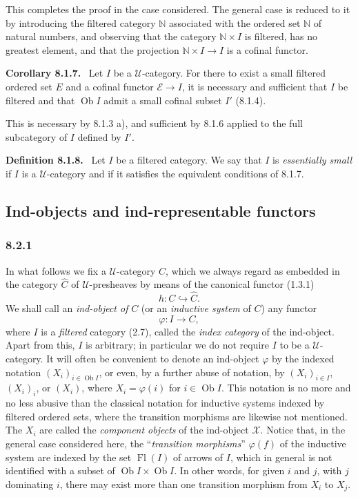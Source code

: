 \documentclass[11pt]{article}
\newcommand{\U}{\mathcal{U}}
\newcommand{\Ob}{\operatorname{Ob}}
\newcommand{\Fl}{\operatorname{Fl}}
\newenvironment{statement}[1]{\par\medskip\noindent\textbf{#1.}\ }{\par\medskip}
\begin{document}
This completes the proof in the case considered. The general case is reduced to it by introducing the filtered category $\mathbb N$ associated with the ordered set $\mathbb N$ of natural numbers, and observing that the category $\mathbb N\times I$ is filtered, has no greatest element, and that the projection $\mathbb N\times I\to I$ is a cofinal functor.

\begin{statement}{Corollary 8.1.7}
Let $I$ be a $\U$-category. For there to exist a small filtered ordered set $E$ and a cofinal functor $\mathcal E\to I$, it is necessary and sufficient that $I$ be filtered and that $\Ob I$ admit a small cofinal subset $I'$ (8.1.4).
\end{statement}

This is necessary by 8.1.3 a), and sufficient by 8.1.6 applied to the full subcategory of $I$ defined by $I'$.

\begin{statement}{Definition 8.1.8}
Let $I$ be a filtered category. We say that $I$ is \emph{essentially small} if $I$ is a $\U$-category and if it satisfies the equivalent conditions of 8.1.7.
\end{statement}

\subsection{Ind-objects and ind-representable functors}

\subsubsection*{8.2.1}
In what follows we fix a $\U$-category $C$, which we always regard as embedded in the category $\widehat C$ of $\U$-presheaves by means of the canonical functor (1.3.1)
\[
h:C\hookrightarrow \widehat C.
\tag{8.2.1.1}
\]
We shall call an \emph{ind-object of} $C$ (or an \emph{inductive system} of $C$) any functor
\[
\varphi:I\longrightarrow C,
\tag{8.2.1.2}
\]
where $I$ is a \emph{filtered} category (2.7), called the \emph{index category} of the ind-object. Apart from this, $I$ is arbitrary; in particular we do not require $I$ to be a $\U$-category. It will often be convenient to denote an ind-object $\varphi$ by the indexed notation $(X_i)_{i\in\Ob I}$, or even, by a further abuse of notation, by $(X_i)_{i\in I}$, $(X_i)_i$, or $(X_i)$, where $X_i=\varphi(i)$ for $i\in\Ob I$. This notation is no more and no less abusive than the classical notation for inductive systems indexed by filtered ordered sets, where the transition morphisms are likewise not mentioned. The $X_i$ are called the \emph{component objects} of the ind-object $\mathcal X$. Notice that, in the general case considered here, the ``\emph{transition morphisms}'' $\varphi(f)$ of the inductive system are indexed by the set $\Fl(I)$ of arrows of $I$, which in general is not identified with a subset of $\Ob I\times\Ob I$. In other words, for given $i$ and $j$, with $j$ dominating $i$, there may exist more than one transition morphism from $X_i$ to $X_j$.
\end{document}
